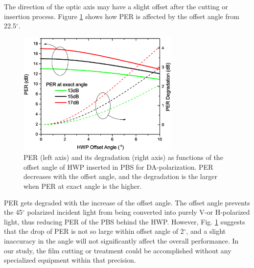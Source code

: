 \documentclass[letterpaper, 10pt]{article}
\begin{document}
The direction of the optic axis may have a slight offset after the cutting  or  insertion process.
Figure \ref{fig:angle_offset} shows how PER is affected by the offset angle from 22.5$^\circ$.
\begin{figure}
  \centering
  \includegraphics[width=8cm]{./offset_angle}
  \caption{PER (left axis) and its degradation (right axis) as functions of the offset angle of HWP inserted in PBS for DA-polarization. PER decreases with the offset angle, and the degradation is the larger when PER at exact angle is the higher.}
  \label{fig:angle_offset}
\end{figure}
PER gets degraded with the increase of the offset angle.
The offset angle prevents the 45$^\circ$ polarized incident light from being converted into purely V-or H-polarized light, thus reducing PER of the PBS behind the HWP.
However, Fig. \ref{fig:angle_offset} suggests that the drop of PER is not so large within  offset angle of 2$^\circ$, and  a slight inaccuracy in the angle  will not significantly affect the overall performance.
In our study, the film cutting or treatment could be accomplished without any specialized equipment within that precision.
\end{document}
